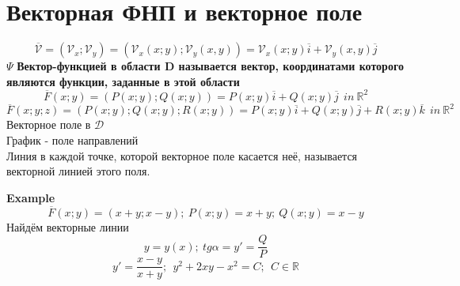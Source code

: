\documentclass{article}
\begin{document}
 
\section{Векторная ФНП и векторное поле}
\begin{equation*}
    \overline{\mathcal{V}} = (\mathcal{V}_x; \mathcal{V}_y) = (\mathcal{V}_x(x;y);\mathcal{V}_y(x,y)) = \mathcal{V}_x(x;y)\overline{i}+\mathcal{V}_y(x,y)\overline{j}
\end{equation*}
$\Psi$ \textbf{Вектор-функцией в области D называется вектор, координатами которого являются функции, заданные в этой области}
\begin{equation*}
    \overline{F}(x;y) = (P(x;y); Q(x;y)) = P(x;y)\overline{i}+Q(x;y)\overline{j}\ \ in \ \mathbb{R}^2
\end{equation*}
\begin{equation*}
    \overline{F}(x;y;z) = (P(x;y); Q(x;y); R(x;y)) = P(x;y)\overline{i}+Q(x;y)\overline{j}+R(x;y)\overline{k}\ \ in \ \mathbb{R}^2
\end{equation*}
Векторное поле в $\mathcal{D}$
\\
График - поле направлений
\\
Линия в каждой точке, которой векторное поле касается неё, называется векторной линией этого поля.

\textbf{Example}
\begin{equation*}
    \overline{F}(x;y) = (x+y;x-y);\ P(x;y) = x+y;\ Q(x;y) = x-y
\end{equation*}
Найдём векторные линии
\begin{equation*}
    y=y(x);\ tg\alpha = y' = \frac{Q}{P}
\end{equation*}
\begin{equation*}
    y'= \frac{x-y}{x+y};\ \ y^2+2xy-x^2=C;\ \ C\in\mathbb{R}
\end{equation*}
\end{document}
